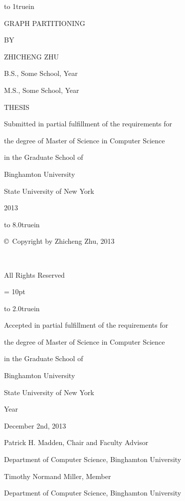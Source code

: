 \documentclass[12pt,oneside]{book}
\theoremstyle{plain}
\theoremstyle{definition}
\begin{document}
\frontmatter

\thispagestyle{empty}

\vbox to 1truein{}

\centerline{GRAPH PARTITIONING}

\vskip 150pt

\centerline{BY}
\vskip 10pt

\centerline{ZHICHENG ZHU}
\vskip 10pt

\centerline{B.S., Some School, Year}
\centerline{M.S., Some School, Year}

\vskip 200pt

\centerline{THESIS}
\vskip 10pt

\centerline{Submitted in partial fulfillment of the requirements for}
\centerline{the degree of Master of Science in Computer Science}
\centerline{in the Graduate School of}
\centerline{Binghamton University}
\centerline{State University of New York}
\centerline{2013}

\newpage

\thispagestyle{empty}

\vbox to 8.0truein{}

\centerline{\copyright\ Copyright by Zhicheng Zhu, 2013}

\

\centerline{All Rights Reserved}

\newpage

{\baselineskip = 10pt

\vbox to 2.0truein{}


\centerline{Accepted in partial fulfillment of the requirements for}
\centerline{the degree of Master of Science in Computer Science}
\centerline{in the Graduate School of}
\centerline{Binghamton University}
\centerline{State University of New York}
\centerline{Year}
\vskip 60pt

\centerline{December 2nd, 2013}
\vskip 70pt

\centerline{Patrick H. Madden, Chair and Faculty Advisor}
\centerline{Department of Computer Science, Binghamton University}
\vskip 50pt

\centerline{Timothy Normand Miller, Member}
\centerline{Department of Computer Science, Binghamton University}
\vskip 50pt




}
\end{document}
